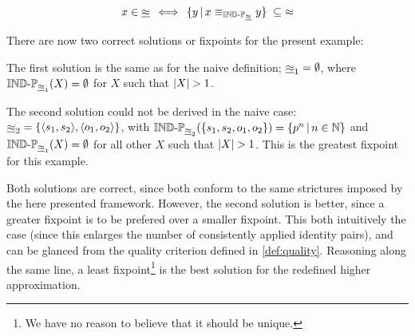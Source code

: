 \begin{definition}
\label{def:identity_lower_approximation_fixpoint}
\begin{align}
  x \in \underline{\approx}
\, \iff \,
    \{y\,\vert\,x \equiv_{\operatorname{{\mathbb{IND}-\mathbb{P}}}_{\underline{\approx}}} y\}
  \; \subseteq \;
    \approx\nonumber
\end{align}
\end{definition}

There are now two correct solutions or fixpoints for the present example:

The first solution is the same as for the naive definition;
  $\underline{\approx}_1 = \emptyset$,
  where $\operatorname{{\mathbb{IND}-\mathbb{P}}}_{\underline{\approx}_1}(X) = \emptyset$
  for $X$ such that $\lvert X\rvert > 1$.

The second solution could not be derived in the naive case:
  $\underline{\approx}_2 = \{\langle s_1,s_2\rangle,\langle o_1,o_2\rangle\}$,
  with $\operatorname{{\mathbb{IND}-\mathbb{P}}}_{\underline{\approx}_2}(\{s_1,s_2,o_1,o_2\}) = \{p^n\,\vert\,n \in \mathbb{N}\}$
  and $\operatorname{{\mathbb{IND}-\mathbb{P}}}_{\underline{\approx}_1}(X) = \emptyset$
  for all other $X$ such that $\lvert X\rvert > 1$.
This is the greatest fixpoint for this example.

Both solutions are correct,
  since both conform to the same strictures imposed by the here presented
  framework.
However, the second solution is better, since a greater fixpoint is
  to be prefered over a smaller fixpoint.
This both intuitively the case
  (since this enlarges the number of consistently applied identity pairs),
  and can be glanced from the quality criterion defined in \ref{def:quality}.
Reasoning along the same line,
  a least fixpoint\footnote{
    We have no reason to believe that it should be unique.
  } is the best solution for the redefined higher approximation.
